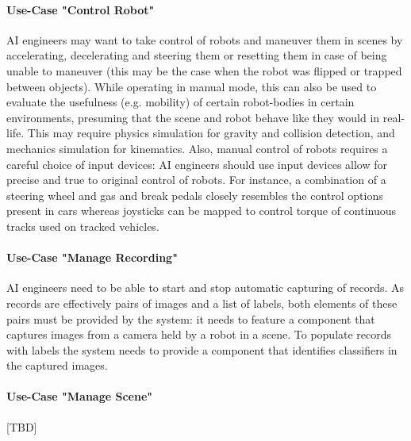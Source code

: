 \paragraph{Use-Case "Control Robot"} \acs{AI} engineers may want to take control of robots and maneuver them in scenes by accelerating, decelerating and steering them or resetting them in case of being unable to maneuver (this may be the case when the robot was flipped or trapped between objects). While operating in manual mode, this can also be used to evaluate the usefulness (e.g. mobility) of certain robot-bodies in certain environments, presuming that the scene and robot behave like they would in real-life. This may require physics simulation for gravity and collision detection, and mechanics simulation for kinematics. Also, manual control of robots requires a careful choice of input devices: \acs{AI} engineers should use input devices allow for precise and true to original control of robots. For instance, a combination of a steering wheel and gas and break pedals closely resembles the control options present in cars whereas joysticks can be mapped to control torque of continuous tracks used on tracked vehicles.

\paragraph{Use-Case "Manage Recording"} \acs{AI} engineers need to be able to start and stop automatic capturing of records. As records are effectively pairs of images and a list of labels, both elements of these pairs must be provided by the system: it needs to feature a component that captures images from a camera held by a robot in a scene. To populate records with labels the system needs to provide a component that identifies classifiers in the captured images.

\paragraph{Use-Case "Manage Scene"}
[TBD]

